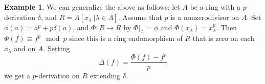 \documentclass{amsart}[12pt]
\newcommand{\May}[1]{\textcolor{violet}{Lecture of May #1, 2023}}
\numberwithin{equation}{section}
\theoremstyle{plain} %
\theoremstyle{definition}
\newtheorem{defn}[equation]{Definition}
\newtheorem{ex}[equation]{Example}
\theoremstyle{remark}
\newtheorem{rem}[equation]{Remark}
\begin{document}
   \begin{ex} We can generalize the above as follows: 
let $A$ be a ring with a $p$-derivation $\delta$, and $R=A[x_{\lambda} \ | \lambda\in \Lambda]$. Assume that $p$ is a nonzerodivisor on $A$. Set $\phi(a) = a^p + p \delta(a)$, and $\Phi: R\to R$ by $\Phi|_A=\phi$ and $\Phi(x_\lambda) = x_\lambda^p$. Then $\Phi(f) \equiv f^p \mod p$ since this is a ring endomorphism of $R$ that is zero on each $x_\lambda$ and on $A$. Setting 
\[ \Delta(f) = \frac{\Phi(f) - f^p}{p}\]
we get a $p$-derivation on $R$ extending $\delta$.
\end{ex}

\end{document}
